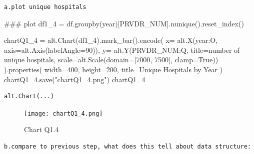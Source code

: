\documentclass[
  letterpaper,
  DIV=11,
  numbers=noendperiod]{scrartcl}
\newenvironment{Shaded}{\begin{snugshade}}{\end{snugshade}}
\newcommand{\CommentTok}[1]{\textcolor[rgb]{0.37,0.37,0.37}{#1}}
\newcommand{\DecValTok}[1]{\textcolor[rgb]{0.68,0.00,0.00}{#1}}
\newcommand{\NormalTok}[1]{\textcolor[rgb]{0.00,0.23,0.31}{#1}}
\newcommand{\OperatorTok}[1]{\textcolor[rgb]{0.37,0.37,0.37}{#1}}
\newcommand{\StringTok}[1]{\textcolor[rgb]{0.13,0.47,0.30}{#1}}
\newcommand{\VariableTok}[1]{\textcolor[rgb]{0.07,0.07,0.07}{#1}}
\begin{document}
\begin{verbatim}
a.plot unique hospitals
\end{verbatim}

\begin{Shaded}
\begin{Highlighting}[]
\CommentTok{\#\#\# plot}
\NormalTok{df1\_4 }\OperatorTok{=}\NormalTok{ df.groupby(}\StringTok{\textquotesingle{}year\textquotesingle{}}\NormalTok{)[}\StringTok{\textquotesingle{}PRVDR\_NUM\textquotesingle{}}\NormalTok{].nunique().reset\_index()}

\NormalTok{chartQ1\_4 }\OperatorTok{=}\NormalTok{ alt.Chart(df1\_4).mark\_bar().encode(}
\NormalTok{    x}\OperatorTok{=}\NormalTok{ alt.X(}\StringTok{\textquotesingle{}year:O\textquotesingle{}}\NormalTok{, axis}\OperatorTok{=}\NormalTok{alt.Axis(labelAngle}\OperatorTok{=}\DecValTok{90}\NormalTok{)),}
\NormalTok{    y}\OperatorTok{=}\NormalTok{ alt.Y(}\StringTok{\textquotesingle{}PRVDR\_NUM:Q\textquotesingle{}}\NormalTok{, title}\OperatorTok{=}\StringTok{\textquotesingle{}number of unique hospitals\textquotesingle{}}\NormalTok{, scale}\OperatorTok{=}\NormalTok{alt.Scale(domain}\OperatorTok{=}\NormalTok{[}\DecValTok{7000}\NormalTok{, }\DecValTok{7500}\NormalTok{], clamp}\OperatorTok{=}\VariableTok{True}\NormalTok{))}
\NormalTok{).properties(}
\NormalTok{    width}\OperatorTok{=}\DecValTok{400}\NormalTok{, }
\NormalTok{    height}\OperatorTok{=}\DecValTok{200}\NormalTok{, }
\NormalTok{    title}\OperatorTok{=}\StringTok{\textquotesingle{}Unique Hospitals by Year\textquotesingle{}}  
\NormalTok{)}
\NormalTok{chartQ1\_4.save(}\StringTok{"chartQ1\_4.png"}\NormalTok{)}
\NormalTok{chartQ1\_4}
\end{Highlighting}
\end{Shaded}

\begin{verbatim}
alt.Chart(...)
\end{verbatim}

\begin{figure}[H]

{\centering \texttt{[image: chartQ1\_4.png]}

}

\caption{Chart Q1.4}

\end{figure}%

\begin{verbatim}
b.compare to previous step, what does this tell about data structure:
\end{verbatim}
\end{document}
